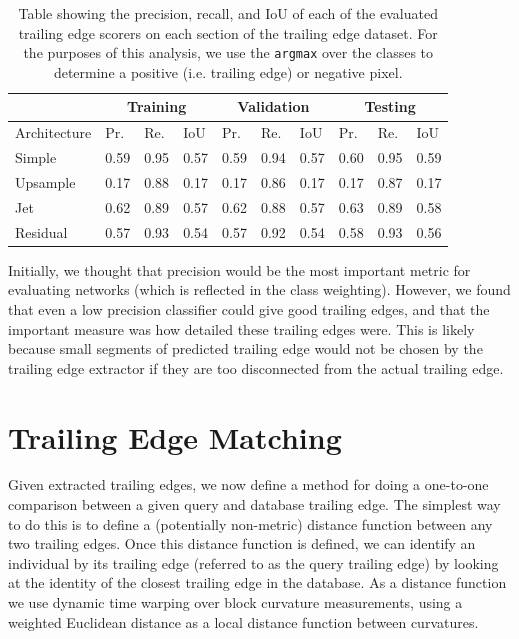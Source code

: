 

\begin{table}[!htb]%
	\centering
	\resizebox{\linewidth}{!}
	{
		\begin{tabular} {l || l | l | l || l | l | l || l | l | l |}
		& \multicolumn{3}{c||}{Training} & \multicolumn{3}{c||}{Validation} & \multicolumn{3}{c|}{Testing} \\
		\hline
		Architecture & Pr. & Re. & IoU & Pr. & Re. & IoU & Pr. & Re. & IoU \\
		\hhline{=#===#===#===|}
		Simple & 0.59 & 0.95 & 0.57 & 0.59 & 0.94 & 0.57 & 0.60 & 0.95 & 0.59 \\
		\hline
		Upsample & 0.17 & 0.88 & 0.17 & 0.17 & 0.86 & 0.17 & 0.17 & 0.87 & 0.17 \\
		\hline
		Jet & 0.62 & 0.89 & 0.57 & 0.62 & 0.88 & 0.57 & 0.63 & 0.89 & 0.58 \\
		\hline
		Residual & 0.57 & 0.93 & 0.54 & 0.57 & 0.92 & 0.54 & 0.58 & 0.93 & 0.56 \\
		\hline
		\end{tabular}
	}
	\caption{Table showing the precision, recall, and IoU of each of the evaluated trailing edge scorers on each section of the trailing edge dataset. For the purposes of this analysis, we use the \texttt{argmax} over the classes to determine a positive (i.e. trailing edge) or negative pixel.}
	\label{tab:te_score_full_analysis}
\end{table}

Initially, we thought that precision would be the most important metric for evaluating networks (which is reflected in the class weighting).
However, we found that even a low precision classifier could give good trailing edges, and that the important measure was how detailed these trailing edges were.
This is likely because small segments of predicted trailing edge would not be chosen by the trailing edge extractor if they are too disconnected from the actual trailing edge.


\section{Trailing Edge Matching}

Given extracted trailing edges, we now define a method for doing a one-to-one comparison between a given query and database trailing edge.
The simplest way to do this is to define a (potentially non-metric) distance function between any two trailing edges.
Once this distance function is defined, we can identify an individual by its trailing edge (referred to as the query trailing edge) by looking at the identity of the closest trailing edge in the database.
As a distance function we use dynamic time warping over block curvature measurements, using a weighted Euclidean distance as a local distance function between curvatures.

